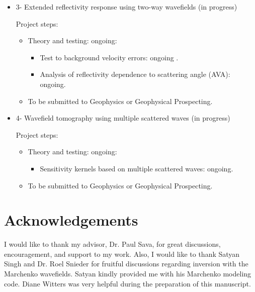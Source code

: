 \begin{itemize}
        
  \item {3- Extended reflectivity response using two-way wavefields (in progress) }


        Project steps: 
          \begin{itemize}
            \item Theory and testing: ongoing:
            \begin{itemize}
                \item Test to background velocity errors: ongoing .
                \item Analysis of reflectivity dependence to scattering angle (AVA): ongoing.
            \end{itemize}  
            \item To be submitted to Geophysics or Geophysical Prospecting.
          \end{itemize}  

  \item {4- Wavefield tomography using multiple scattered waves (in progress) } 


        Project steps: 
          \begin{itemize}
            \item Theory and testing: ongoing:
            \begin{itemize}
                \item Sensitivity kernels based on multiple scattered waves: ongoing.
            \end{itemize}  
            \item To be submitted to Geophysics or Geophysical Prospecting.
          \end{itemize}  

\end{itemize}


\section{Acknowledgements} 
I would like to thank my advisor, Dr. Paul Sava, for great discussions, encouragement, 
and support to my work. Also, I would like to thank Satyan Singh and Dr. Roel Snieder 
for fruitful discussions regarding inversion with the Marchenko wavefields. 
Satyan kindly provided me with his Marchenko modeling code.
 Diane Witters was very helpful during the preparation of this manuscript. 
